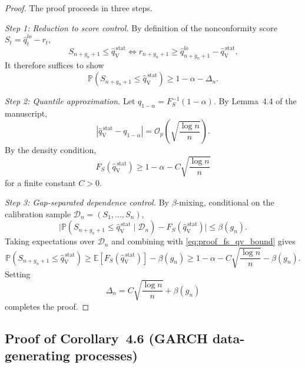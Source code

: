 \documentclass[preprint,11pt,authoryear]{elsarticle}
\newcommand{\1}{\boldsymbol{1}}
\newcommand{\qVstat}{\hat{q}_{\scriptscriptstyle\mathrm{V}}^{\,\mathrm{stat}}}
\begin{document}
\begin{proof}
	The proof proceeds in three steps.
	
	\textit{Step 1: Reduction to score control.}
	By definition of the nonconformity score
	$S_t=\hat q_t^{lo}-r_t$,
	\begin{equation}
		\label{eq:proof_score_event}
		S_{n+g_n+1}\le\qVstat
		\Longleftrightarrow
		r_{n+g_n+1}\ge \hat q_{n+g_n+1}^{lo}-\qVstat.
	\end{equation}
	It therefore suffices to show
	\begin{equation}
		\label{eq:proof_target_coverage}
		\mathbb P(S_{n+g_n+1}\le\qVstat)
		\ge
		1-\alpha-\Delta_n.
	\end{equation}
	
\textit{Step 2: Quantile approximation.}
Let $q_{1-\alpha}=F_S^{-1}(1-\alpha)$. By
Lemma~4.4 of the manuscript,
\begin{equation}
	\label{eq:proof_qv_rate}
	|\qVstat-q_{1-\alpha}|
	=
	\mathcal O_p\!\left(\sqrt{\frac{\log n}{n}}\right).
\end{equation}
By the density condition,
\begin{equation}
	\label{eq:proof_fs_qv_bound}
	F_S(\qVstat)
	\ge
	1-\alpha
	-
	C\sqrt{\frac{\log n}{n}}
\end{equation}
for a finite constant $C>0$.

\textit{Step 3: Gap-separated dependence control.}
By $\beta$-mixing, conditional on the calibration sample
$\mathcal D_n=(S_1,\ldots,S_n)$,
\begin{equation}
	\label{eq:proof_conditional_gap}
	\bigl|
	\mathbb P(S_{n+g_n+1}\le\qVstat\mid\mathcal D_n)
	-
	F_S(\qVstat)
	\bigr|
	\le
	\beta(g_n).
\end{equation}
Taking expectations over $\mathcal D_n$ and combining with
\eqref{eq:proof_fs_qv_bound} gives
\[
\mathbb P(S_{n+g_n+1}\le\qVstat)
\ge
\mathbb E\!\left[F_S(\qVstat)\right]-\beta(g_n)
\ge
1-\alpha
-
C\sqrt{\frac{\log n}{n}}
-\beta(g_n).
\]
Setting
\begin{equation}
	\label{eq:proof_delta_n}
	\Delta_n
	=
	C\sqrt{\frac{\log n}{n}}+\beta(g_n)
\end{equation}
completes the proof.
\end{proof}

\subsection{Proof of Corollary~4.6 (GARCH data-generating processes)}
\label{app:cor_garch}
\end{document}
